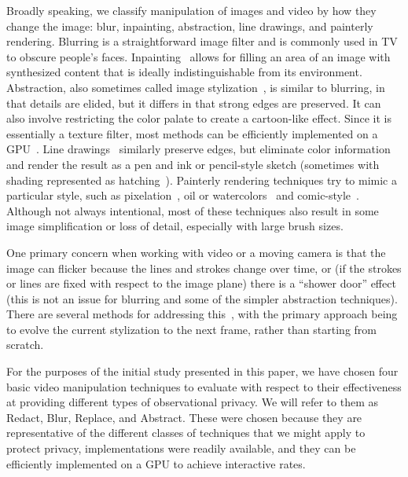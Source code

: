\documentclass{acm_proc_article-sp}
\begin{document}
Broadly speaking, we classify manipulation of images and video by how they change the image:  blur, inpainting, abstraction, line drawings, and painterly rendering.  Blurring is a straightforward image filter and is commonly used in TV to obscure people's faces.  Inpainting~\cite{Barnes:2009, Bugeau:2010, Drori:2003, Herling:2012, Sun:2005, VijayVenkatesh:2009} allows for filling an area of an image with synthesized content that is ideally indistinguishable from its environment.  Abstraction, also sometimes called image stylization~\cite{Kyprianidis:2011, Winnemoller:2012, Mould:2012, Winnemoller:2011, DeCarlo:2002}, is similar to blurring, in that details are elided, but it differs in that strong edges are preserved.  It can also involve restricting the color palate to create a cartoon-like effect.  Since it is essentially a texture filter, most methods can be efficiently implemented on a GPU~\cite{Winnemoller:2006, Zhao:2009}.  Line drawings~\cite{DeCarlo:2003, Rusinkiewicz:2005, Eisemann:2008, Gooch:2002, Gooch:2004} similarly preserve edges, but eliminate color information and render the result as a pen and ink or pencil-style sketch (sometimes with shading represented as hatching~\cite{Singh:2010}).  Painterly rendering techniques try to mimic a particular style, such as pixelation~\cite{Gerstner:2012}, oil or watercolors~\cite{Lu:2010, Olsen:2011, Xu:2005, Rosin:2010} and comic-style~\cite{Sauvaget:2008}.  Although not always intentional, most of these techniques also result in some image simplification or loss of detail, especially with large brush sizes.

One primary concern when working with video or a moving camera is that the image can flicker because the lines and strokes change over time, or (if the strokes or lines are fixed with respect to the image plane) there is a ``shower door'' effect (this is not an issue for blurring and some of the simpler abstraction techniques).  There are several methods for addressing this~\cite{Rusinkiewicz:2005, Lu:2010}, with the primary approach being to evolve the current stylization to the next frame, rather than starting from scratch.  

For the purposes of the initial study presented in this paper, we have chosen four basic video manipulation techniques to evaluate with respect to their effectiveness at providing different types of observational privacy.  We will refer to them as Redact, Blur, Replace, and Abstract.  These were chosen because they are representative of the different classes of techniques that we might apply to protect privacy, implementations were readily available, and they can be efficiently implemented on a GPU to achieve interactive rates. 
\end{document}

